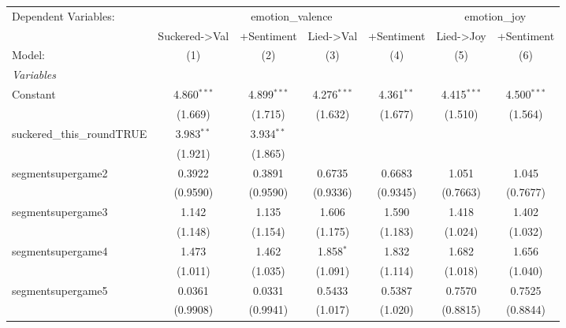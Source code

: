 
\begingroup
\centering
\begin{tabular}{lcccccc}
   \tabularnewline \midrule \midrule
   Dependent Variables: & \multicolumn{4}{c}{emotion\_valence} & \multicolumn{2}{c}{emotion\_joy}\\
                                & Suckered->Val & +Sentiment    & Lied->Val     & +Sentiment    & Lied->Joy     & +Sentiment \\   
   Model:                       & (1)           & (2)           & (3)           & (4)           & (5)           & (6)\\  
   \midrule
   \emph{Variables}\\
   Constant                     & 4.860$^{***}$ & 4.899$^{***}$ & 4.276$^{***}$ & 4.361$^{**}$  & 4.415$^{***}$ & 4.500$^{***}$\\   
                                & (1.669)       & (1.715)       & (1.632)       & (1.677)       & (1.510)       & (1.564)\\   
   suckered\_this\_roundTRUE    & 3.983$^{**}$  & 3.934$^{**}$  &               &               &               &   \\   
                                & (1.921)       & (1.865)       &               &               &               &   \\   
   segmentsupergame2            & 0.3922        & 0.3891        & 0.6735        & 0.6683        & 1.051         & 1.045\\   
                                & (0.9590)      & (0.9590)      & (0.9336)      & (0.9345)      & (0.7663)      & (0.7677)\\   
   segmentsupergame3            & 1.142         & 1.135         & 1.606         & 1.590         & 1.418         & 1.402\\   
                                & (1.148)       & (1.154)       & (1.175)       & (1.183)       & (1.024)       & (1.032)\\   
   segmentsupergame4            & 1.473         & 1.462         & 1.858$^{*}$   & 1.832         & 1.682         & 1.656\\   
                                & (1.011)       & (1.035)       & (1.091)       & (1.114)       & (1.018)       & (1.040)\\   
   segmentsupergame5            & 0.0361        & 0.0331        & 0.5433        & 0.5387        & 0.7570        & 0.7525\\   
                                & (0.9908)      & (0.9941)      & (1.017)       & (1.020)       & (0.8815)      & (0.8844)\\   

\end{tabular}
